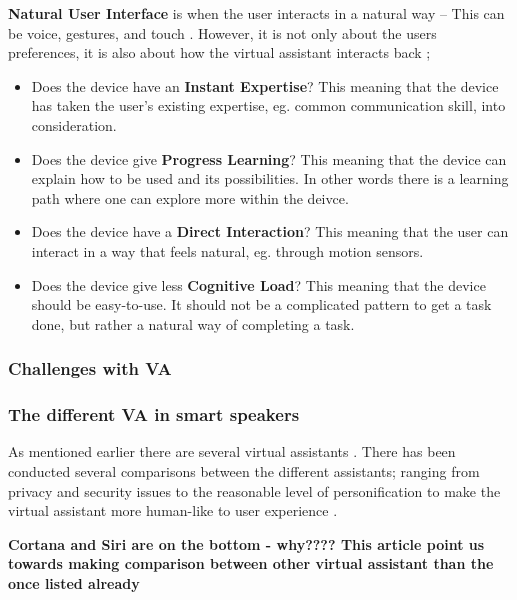 \documentclass[fleqn,10pt]{wlscirep}
\begin{document}
\textbf{Natural User Interface} is when the user interacts in a natural way – This can be voice, gestures, and touch \cite{Interaction-Design-Foundation-NUI}. However, it is not only about the users preferences, it is also about how the virtual assistant interacts back \cite{Interaction-Design-Foundation-NUI}; 
 \begin{itemize}
     \item Does the device have an \textbf{Instant Expertise}? This meaning that the device has taken the user's existing expertise, eg. common communication skill, into consideration. 
     \item Does the device give \textbf{Progress Learning}? This meaning that the device can explain how to be used and its possibilities. In other words there is a learning path where one can explore more within the deivce. 
     \item Does the device have a \textbf{Direct Interaction}? This meaning that the user can interact in a way that feels natural, eg. through motion sensors.
     \item Does the device give less \textbf{Cognitive Load}? This meaning that the device should be easy-to-use. It should not be a complicated pattern to get a task done, but rather a natural way of completing a task. 
 \end{itemize}

\subsubsection{Challenges with VA}

\subsubsection{The different VA in smart speakers}
As mentioned earlier there are several virtual assistants \cite{hoy.m}. There has been conducted several comparisons between the different assistants; ranging from privacy and security issues \cite{hoy.m} to the reasonable level of personification \cite{Kaye.J} to make the virtual assistant more human-like \cite{Clark.L} to user experience \cite{hoy.m, Lopez.G, Berdasco.A, pyae.a, Kaye.J}. 


\textbf{ Cortana and Siri are on the bottom - why???? 
This article point us towards making comparison between other virtual assistant than the once listed already} 
\cite{Berdasco.A}
\end{document}
